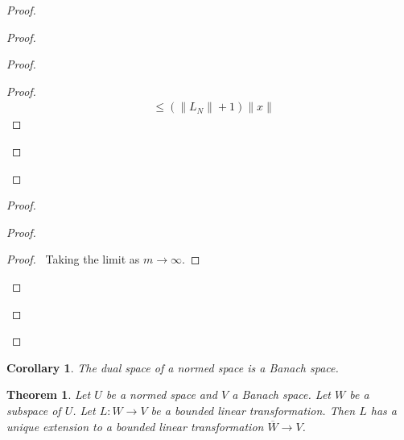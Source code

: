\documentclass{book}
\let\qed\relax
\newtheorem{cor}{Corollary}[ax]
\newtheorem{thm}[ax]{Theorem}
\theoremstyle{definition}
\begin{document}
\begin{proof}
\begin{proof}
\begin{proof}
\begin{proof}
\begin{align*}
				& \leq (\| L_N \| + 1) \| x \|
			\end{align*}
		\end{proof}
	\end{proof}
\end{proof}
\begin{proof}
	\begin{proof}
		\begin{proof}
			\pf\ Taking the limit as $m \rightarrow \infty$.
		\end{proof}
	\end{proof}
\end{proof}
\qed
\end{proof}

\begin{cor}
The dual space of a normed space is a Banach space.
\end{cor}

\begin{thm}
Let $U$ be a normed space and $V$ a Banach space. Let $W$ be a subspace of $U$. Let $L : W \rightarrow V$ be a bounded linear transformation. Then $L$ has a unique extension to a bounded linear transformation $\overline{W} \rightarrow V$.
\end{thm}
\end{document}
